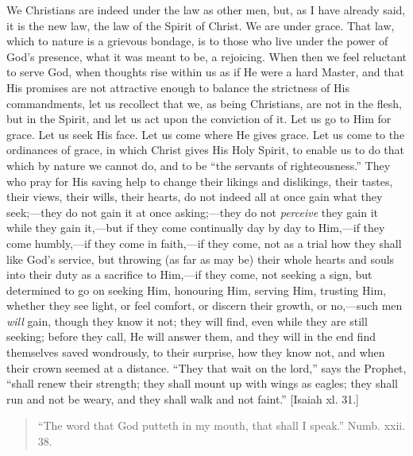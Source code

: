 We Christians are indeed under the law as other men, but, as I have
already said, it is the new law, the law of the Spirit of Christ. We
are under grace. That law, which to nature is a grievous bondage, is
to those who live under the power of God's presence, what it was meant
to be, a rejoicing. When then we feel reluctant to serve God, when
thoughts rise within us as if He were a hard Master, and that His
promises are not attractive enough to balance the strictness of His
commandments, let us recollect that we, as being Christians, are not
in the flesh, but in the Spirit, and let us act upon the conviction of
it. Let us go to Him for grace. Let us seek His face. Let us come
where He gives grace. Let us come to the ordinances of grace, in which
Christ gives His Holy Spirit, to enable us to do that which by nature
we cannot do, and to be ``the servants of righteousness.''
They who pray for His saving help to change their likings and
dislikings, their tastes, their views, their wills, their hearts, do
not indeed all at once gain what they seek;—they do not gain it at
once asking;—they do not \emph{perceive} they gain it while they
gain it,—but if they come continually day by day to Him,—if they
come humbly,—if they come in faith,—if they come, not as a trial
how they shall like God's service, but throwing (as far as may be)
their whole hearts and souls into their duty as a sacrifice to Him,—if
they come, not seeking a sign, but determined to go on seeking Him,
honouring Him, serving Him, trusting Him, whether they see light, or
feel comfort, or discern their growth, or no,—such men \emph{will}
gain, though they know it not; they will find, even while they are
still seeking; before they call, He will answer them, and they will in
the end find themselves saved wondrously, to their surprise, how they
know not, and when their crown seemed at a distance. ``They that
wait on the lord,'' says the Prophet, ``shall renew their
strength; they shall mount up with wings as eagles; they shall run and
not be weary, and they shall walk and not faint.'' [Isaiah xl.
31.]


\begin{quote}

``The word that God putteth in my mouth, that shall I
speak.'' Numb. xxii. 38.

\end{quote}

